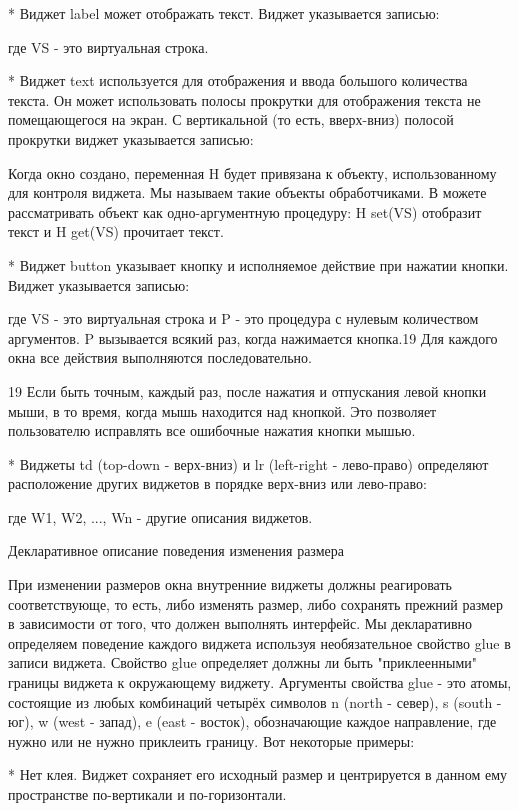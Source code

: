 * Виджет label может отображать текст. Виджет указывается записью:

где VS - это виртуальная строка.

* Виджет text используется для отображения и ввода большого количества текста. Он может использовать полосы прокрутки для отображения текста не помещающегося на экран. С вертикальной (то есть, вверх-вниз) полосой прокрутки виджет указывается записью:

Когда окно создано, переменная H будет привязана к объекту, использованному для контроля виджета. Мы называем такие объекты обработчиками. В можете рассматривать объект как одно-аргументную процедуру: {H set(VS)} отобразит текст и {H get(VS)} прочитает текст.

* Виджет button указывает кнопку и исполняемое действие при нажатии кнопки. Виджет указывается записью:

где VS - это виртуальная строка и P - это процедура с нулевым количеством аргументов. {P} вызывается всякий раз, когда нажимается кнопка.19 Для каждого окна все действия выполняются последовательно.

19 Если быть точным, каждый раз, после нажатия и отпускания левой кнопки мыши, в то время, когда мышь находится над кнопкой. Это позволяет пользователю исправлять все ошибочные нажатия кнопки мышью.

* Виджеты td (top-down - верх-вниз) и lr (left-right - лево-право) определяют расположение других виджетов в порядке верх-вниз или лево-право:

где W1, W2, ..., Wn - другие описания виджетов.

Декларативное описание поведения изменения размера

При изменении размеров окна внутренние виджеты должны реагировать соответствующе, то есть, либо изменять размер, либо сохранять прежний размер в зависимости от того, что должен выполнять интерфейс. Мы декларативно определяем поведение каждого виджета используя необязательное свойство glue в записи виджета. Свойство glue определяет должны ли быть "приклеенными" границы виджета к окружающему виджету. Аргументы свойства glue - это атомы, состоящие из любых комбинаций четырёх символов n (north - север), s (south - юг), w (west - запад), e (east - восток), обозначающие каждое направление, где нужно или не нужно приклеить границу. Вот некоторые примеры:

* Нет клея. Виджет сохраняет его исходный размер и центрируется в данном ему пространстве по-вертикали и по-горизонтали.

